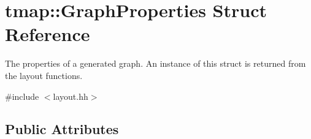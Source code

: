 \hypertarget{structtmap_1_1GraphProperties}{}\section{tmap\+:\+:Graph\+Properties Struct Reference}
\label{structtmap_1_1GraphProperties}


The properties of a generated graph. An instance of this struct is returned from the layout functions.  




{\ttfamily \#include $<$layout.\+hh$>$}

\subsection*{Public Attributes}
